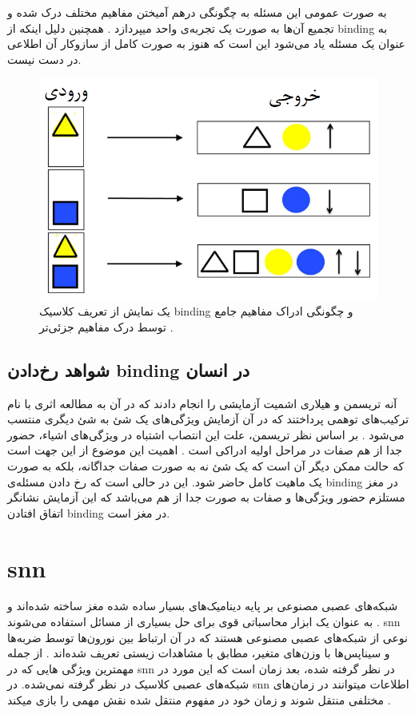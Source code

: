 \documentclass[12pt]{report}
\begin{document}
	به صورت عمومی این مسئله به چگونگی در‌هم آمیختن مفاهیم مختلف درک شده و تجمیع آن‌ها به صورت یک تجربه‌ی واحد میپردازد
	\cite{Feldman2012}.
	همچنین دلیل اینکه از \gls{binding} به عنوان یک مسئله یاد می‌شود این است که هنوز به صورت کامل از سازوکار آن اطلاعی در دست نیست.
	
	\begin{figure}[H]
		\centering
		\includegraphics[width=0.7\linewidth]{binding.png}
		\caption[NS]{
			یک نمایش از تعریف کلاسیک \gls{binding} و چگونگی ادراک مفاهیم جامع توسط درک مفاهیم جزئی‌تر
			\cite{velic2012}.
		}
		\label{fig:binding}
	\end{figure}
	
	
	\subsection{شواهد رخ‌دادن \gls{binding} در انسان}
	
	آنه تریسمن
	و هیلاری اشمیت
	آزمایشی را انجام دادند که در آن به مطالعه اثری با نام ترکیب‌های توهمی
	پرداختند که در آن آزمایش ویژگی‌های یک شئ به شئ دیگری منتسب می‌شود
	\cite{TREISMAN1982107}.
	بر اساس نظر تریسمن، علت این انتصاب اشتباه در ویژگی‌های اشیاء، حضور جدا از هم صفات در مراحل اولیه ادراکی است
	\cite{goldstein_2019}.
	اهمیت این موضوع از این جهت است که حالت ممکن دیگر آن است که یک شئ نه به صورت صفات جداگانه، بلکه به صورت یک ماهیت کامل حاضر شود. این در حالی است که رخ دادن مسئله‌ی \gls{binding} در مغز مستلزم حضور ویژگی‌ها و صفات به صورت جدا از هم می‌باشد که این آزمایش نشانگر اتفاق افتادن \gls{binding} در مغز است.
	
	
	\section{\gls{snn}}
	شبکه‌های عصبی مصنوعی بر پایه دینامیک‌های بسیار ساده شده مغز ساخته شده‌اند و به عنوان یک ابزار محاسباتی قوی برای حل بسیاری از مسائل استفاده می‌شوند
	\cite{TGNN}. 
	\gls{snn} نوعی از شبکه‌های عصبی مصنوعی هستند که در آن ارتباط بین نورون‌ها توسط ضربه‌ها و سیناپس‌ها  با وزن‌های متغیر، مطابق با مشاهدات زیستی تعریف شده‌اند
	\cite{ghosh2009spiking}. 
	از جمله مهمترین ویژگی هایی که در \gls{snn} در نظر گرفته شده، بعد زمان است
	\cite{Mozafari2019}
	که این مورد در شبکه‌های عصبی کلاسیک در نظر گرفته نمی‌شده. در \gls{snn} اطلاعات میتوانند در زمان‌های مختلفی منتقل شوند و زمان خود در مفهوم منتقل شده نقش مهمی را بازی میکند
	\cite{SNN1997}.
	
\end{document}
